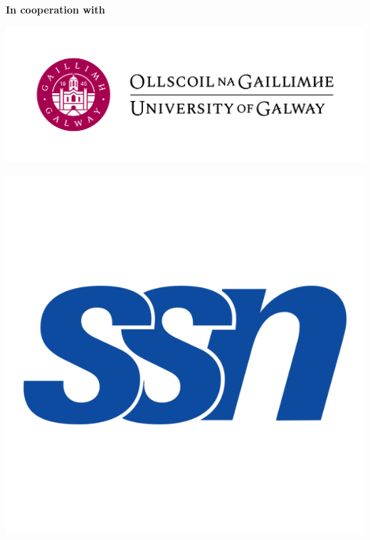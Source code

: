 \documentclass[11pt,oneside]{book}
\begin{document}
    \begin{samepage}
  \noindent
  {\Large \textbf{In cooperation with}}

  \nopagebreak
            \begin{minipage}[c][0.21\linewidth][c]{0.21\linewidth}
        \includegraphics[width=\linewidth]{LT-EDI-2025/sponsor_logos/uog.jpg}
      \end{minipage}\hspace{0.05\linewidth}
          \begin{minipage}[c][0.21\linewidth][c]{0.21\linewidth}
        \includegraphics[width=\linewidth]{LT-EDI-2025/sponsor_logos/ssn.png}
      \end{minipage}\hspace{0.05\linewidth}
          \begin{minipage}[c][0.21\linewidth][c]{0.21\linewidth}

\end{minipage}
\end{samepage}
\end{document}
